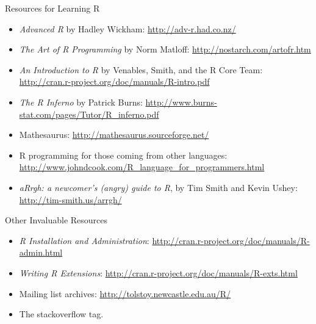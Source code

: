 \begin{frame}
  \begin{block}{Resources for Learning R}\pause
  \begin{itemize}[<+-|alert@+>]
    \item \emph{Advanced R} by Hadley Wickham: \url{http://adv-r.had.co.nz/}
    \item \emph{The Art of R Programming} by Norm Matloff:  
\url{http://nostarch.com/artofr.htm}\\[.2cm]

    \item \emph{An Introduction to R} by Venables, Smith, and the R Core Team:
\url{http://cran.r-project.org/doc/manuals/R-intro.pdf}\\[.2cm]

    \item \emph{The R Inferno} by Patrick Burns:
\url{http://www.burns-stat.com/pages/Tutor/R_inferno.pdf}\\[.2cm]

    \item Mathesaurus:  \url{http://mathesaurus.sourceforge.net/}\\[.2cm]

    \item R programming for those coming from other languages:  
\url{http://www.johndcook.com/R_language_for_programmers.html}\\[.2cm]

    \item \emph{aRrgh: a newcomer's (angry) guide to R}, by Tim Smith and Kevin 
Ushey: 
    \url{http://tim-smith.us/arrgh/}
  \end{itemize}
\end{block}
\end{frame}


\begin{frame}
  \begin{block}{Other Invaluable Resources}\pause
  \begin{itemize}[<+-|alert@+>]
    \item \emph{R Installation and Administration}: 
\url{http://cran.r-project.org/doc/manuals/R-admin.html}
    \item \emph{Writing R Extensions}: 
\url{http://cran.r-project.org/doc/manuals/R-exts.html}
     \item Mailing list archives: \url{http://tolstoy.newcastle.edu.au/R/}
     \item The \code{[R]} stackoverflow tag.
  \end{itemize}
\end{block}
\end{frame}